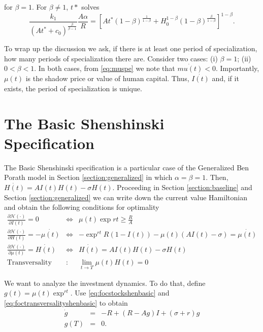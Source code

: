 \noindent for $\beta = 1$. For $\beta \neq 1$, $t*$ solves
\begin{equation}
\frac{k_{1}}{ \left( At^* + c_{0} \right)^{\frac{\beta}{\beta-1}}} \frac{A \alpha}{R} = \left[ At^* \left( 1 - \beta \right)^{\frac{1}{1 - \beta}} + H_{0}^{1 - \beta} \left( 1 - \beta \right)^{\frac{\beta}{1 - \beta}} \right]^{1 - \beta}.
\end{equation}

\indent To wrap up the discussion we ask, if there is at least one period of specialization, how many periods of specialization there are. Consider two cases: (i) $\beta = 1$; (ii) $0 < \beta < 1$. In both cases, from \eqref{eq:muspe} we note that $\dot{mu(t)} < 0$. Importantly, $\mu(t)$ is the shadow price or value of human capital. Thus, $\dot{I(t)}$ and, if it exists, the period of specialization is unique.
 
\section{The Basic Shenshinski Specification}
The Basic Shenshinski specification is a particular case of the Generalized Ben Porath model in Section \ref{section:generalized} in which $\alpha = \beta = 1$. Then, $\dot{H(t)} = AI(t)H(t) - \sigma H(t)$. Proceeding in Section \ref{section:baseline} and Section \ref{section:generalized} we can write down the current value Hamiltonian and obtain the following conditions for optimality
\begin{eqnarray}
\frac{\partial \mathcal{H} (\cdot)}{\partial I(t)} = 0 &\Leftrightarrow& \mu(t) \exp{rt} \geq \frac{R}{A} \label{eq:focinvestmentshenbasic} \\
\frac{\partial \mathcal{H} (\cdot)}{\partial H(t)} = - \dot{\mu(t)} &\Leftrightarrow& - \exp^{rt} R(1 - I(t)) - \mu(t) \left( A I(t) - \sigma \right) = \dot{\mu(t)} \label{eq:focstockshenbasic} \\ 
\frac{\partial \mathcal{H} (\cdot)}{\partial \mu(t)} = \dot{H(t)} &\Leftrightarrow& \dot{H(t)} =  A I(t) H(t)- \sigma H(t) \label{eq:focmotionshenbasic} \\
\text{Transversality} &:& \lim_{t \rightarrow T} \mu(t) H(t) = 0 \label{eq:foctransversalityshenbasic}
\end{eqnarray}

\indent We want to analyze the investment dynamics. To do that, define $g(t) = \mu(t) \exp^{rt}$. Use \eqref{eq:focstockshenbasic} and \eqref{eq:foctransversalityshenbasic} to obtain
\begin{eqnarray}
\dot{g} &=& -R + (R - Ag)I + (\sigma + r)g \label{eq:gbasicshen} \\ 
g(T) &=& 0.
\end{eqnarray}

